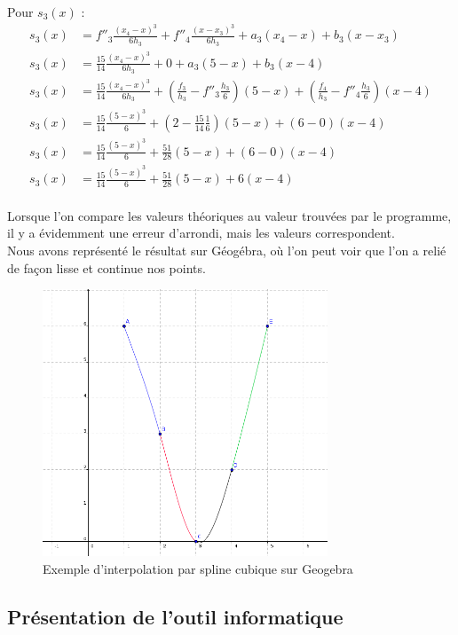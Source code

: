 \documentclass{article}
\begin{document}
\newpage
\begingroup\raggedleft
Pour $s_3(x)$ :
\endgroup
\begin{align*}
s_3(x) & = f''_3\frac{(x_4-x)^3}{6h_3}+ f''_4 \frac{(x-x_3)^3}{6h_3}+a_3(x_4-x) + b_3 (x-x_3)
\\[5pt]
s_3(x) & = \frac{15}{14}\frac{(x_4-x)^3}{6h_3}+ 0 + a_3(5-x) + b_3 (x-4)
\\[5pt]
s_3(x) & = \frac{15}{14}\frac{(x_4-x)^3}{6h_3}+ (\frac{f_3}{h_3}-f''_3 \frac{h_3}{6})(5-x) + (\frac{f_4}{h_3}-f''_4\frac{h_3}{6}) (x-4)
\\[5pt]
s_3(x) & = \frac{15}{14}\frac{(5-x)^3}{6}+ (2-\frac{15}{14} \frac{1}{6})(5-x) + (6-0)(x-4)
\\[5pt]
s_3(x) & = \frac{15}{14}\frac{(5-x)^3}{6}+ \frac{51}{28} (5-x) + (6-0)(x-4)
\\[5pt]
s_3(x) & = \frac{15}{14} \frac{(5-x)^3}{6} + \frac{51}{28}(5-x) + 6(x-4)
\end{align*}
\\
\indent
Lorsque l'on compare les valeurs th\'{e}oriques au valeur trouv\'{e}es par le programme, il y a \'{e}videmment une erreur d'arrondi, mais les valeurs correspondent.\\
Nous avons repr\'{e}sent\'{e} le r\'{e}sultat sur G\'{e}og\'{e}bra, o\`{u} l'on peut voir que l'on a reli\'{e} de fa\c con lisse et continue nos points.
\\
\begin{figure}[h]
	\centering
	\includegraphics[width=8.5cm] {ExempleInterpolationGeogebra.png}
	\caption{Exemple d'interpolation par spline cubique sur Geogebra}
\end{figure}

\newpage
\subsection{Pr\'esentation de l'outil informatique}
\end{document}
